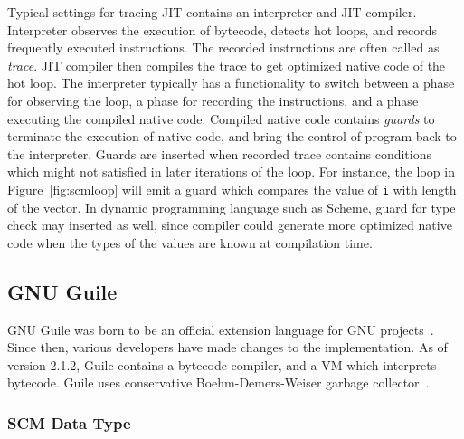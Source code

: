 \documentclass[preprint]{sigplanconf}
\begin{document}
Typical settings for tracing JIT contains an interpreter and JIT
compiler. Interpreter observes the execution of bytecode, detects hot loops, and
records frequently executed instructions. The recorded instructions are often
called as \textit{trace}. JIT compiler then compiles the trace to get optimized
native code of the hot loop. The interpreter typically has a functionality to
switch between a phase for observing the loop, a phase for recording the
instructions, and a phase executing the compiled native code.  Compiled native
code contains \textit{guards} to terminate the execution of native code, and
bring the control of program back to the interpreter. Guards are inserted when
recorded trace contains conditions which might not satisfied in later iterations
of the loop. For instance, the loop in
Figure~\hyperref[fig:scmloop]{\ref{fig:scmloop}} will emit a guard which
compares the value of \texttt{i} with length of the vector. In dynamic
programming language such as Scheme, guard for type check may inserted as well,
since compiler could generate more optimized native code when the types of the
values are known at compilation time.

\subsection{GNU Guile}
\label{sec:backgroundguile}

GNU Guile was born to be an official extension language for GNU
projects~\cite{Galassi02guilereference}. Since then, various developers have
made changes to the implementation. As of version 2.1.2, Guile contains a
bytecode compiler, and a VM which interprets bytecode. Guile uses conservative
Boehm-Demers-Weiser garbage collector~\cite{boehm1988garbage}.


\subsubsection{SCM Data Type}
\end{document}
